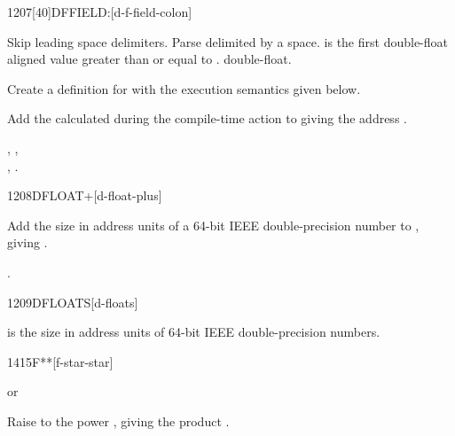 \newpage
\begin{worddef}{1207}[40]{DFFIELD:}[d-f-field-colon]
\item {}

	Skip leading space delimiters. Parse  delimited by
	a space.  is the first double-float aligned value
	greater than or equal to .  
	double-float.

	Create a definition for  with the execution semantics
	given below.

\execute[name]

	Add the  calculated during the compile-time action to
	 giving the address .

\see {},
	, \\
	,
	.
\end{worddef}


\begin{worddef}{1208}{DFLOAT+}[d-float-plus]
\item {}

	Add the size in address units of a 64-bit IEEE double-precision
	number to , giving .

\see {}.
\end{worddef}


\begin{worddef}{1209}{DFLOATS}[d-floats]
\item {}

	 is the size in address units of  64-bit
	IEEE double-precision numbers.
\end{worddef}


\begin{worddef}{1415}{F**}[f-star-star]
\item {} or

	Raise  to the power , giving the product
	.
\end{worddef}


